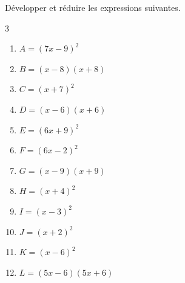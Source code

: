{%
\begin{Exercice}%
Développer et réduire les expressions suivantes.
\begin{multicols}{3}
\begin{enumerate}[itemsep=1em,label={}]
	\item \begin{minipage}[t]{\linewidth}$A=(7x-9)^2$\end{minipage}
	\item \begin{minipage}[t]{\linewidth}$B=(x-8)(x+8)$\end{minipage}
	\item \begin{minipage}[t]{\linewidth}$C=(x+7)^2$\end{minipage}
	\item \begin{minipage}[t]{\linewidth}$D=(x-6)(x+6)$\end{minipage}
	\item \begin{minipage}[t]{\linewidth}$E=(6x+9)^2$\end{minipage}
	\item \begin{minipage}[t]{\linewidth}$F=(6x-2)^2$\end{minipage}
	\item \begin{minipage}[t]{\linewidth}$G=(x-9)(x+9)$\end{minipage}
	\item \begin{minipage}[t]{\linewidth}$H=(x+4)^2$\end{minipage}
	\item \begin{minipage}[t]{\linewidth}$I=(x-3)^2$\end{minipage}
	\item \begin{minipage}[t]{\linewidth}$J=(x+2)^2$\end{minipage}
	\item \begin{minipage}[t]{\linewidth}$K=(x-6)^2$\end{minipage}
	\item \begin{minipage}[t]{\linewidth}$L=(5x-6)(5x+6)$\end{minipage}
\end{enumerate}
\end{multicols}
\end{Exercice}

}
